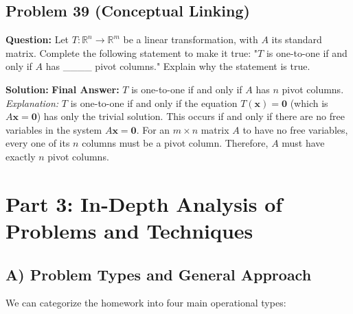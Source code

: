 \documentclass[11pt]{article}
\begin{document}
\subsection*{Problem 39 (Conceptual Linking)}
\textbf{Question:} Let $T: \mathbb{R}^n \to \mathbb{R}^m$ be a linear transformation, with $A$ its standard matrix. Complete the following statement to make it true: "$T$ is one-to-one if and only if $A$ has \_\_\_\_ pivot columns." Explain why the statement is true.

\textbf{Solution:}
\textbf{Final Answer:} $T$ is one-to-one if and only if $A$ has \textbf{$n$} pivot columns. 
\textit{Explanation:} $T$ is one-to-one if and only if the equation $T(\mathbf{x}) = \mathbf{0}$ (which is $A\mathbf{x} = \mathbf{0}$) has only the trivial solution. This occurs if and only if there are no free variables in the system $A\mathbf{x} = \mathbf{0}$. For an $m \times n$ matrix $A$ to have no free variables, every one of its $n$ columns must be a pivot column. Therefore, $A$ must have exactly $n$ pivot columns.

\newpage
\section{Part 3: In-Depth Analysis of Problems and Techniques}

\subsection{A) Problem Types and General Approach}
We can categorize the homework into four main operational types:
\end{document}
